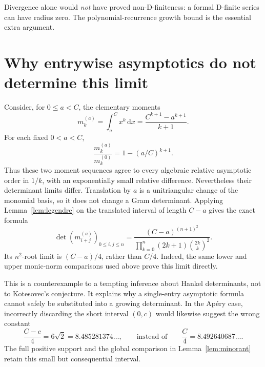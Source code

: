 \documentclass[11pt,a4paper]{article}
\numberwithin{equation}{section}
\theoremstyle{remark}\newtheorem{remark}[theorem]{Remark}
\newcommand{\dd}{\,\mathrm d}
\begin{document}
Divergence alone would \emph{not} have proved non-D-finiteness: a formal
D-finite series can have radius zero. The polynomial-recurrence growth bound
is the essential extra argument.

\section{Why entrywise asymptotics do not determine this limit}
\label{sec:pitfall}
Consider, for $0\leq a<C$, the elementary moments
\[
 m_k^{(a)}=\int_a^Cx^k\dd x=\frac{C^{k+1}-a^{k+1}}{k+1}.
\]
For each fixed $0<a<C$,
\[
 \frac{m_k^{(a)}}{m_k^{(0)}}=1-(a/C)^{k+1}.
\]
Thus these two moment sequences agree to every algebraic relative asymptotic
order in $1/k$, with an exponentially small relative difference.
Nevertheless their determinant limits differ.
Translation by $a$ is a unitriangular change of the monomial basis, so it does
not change a Gram determinant. Applying Lemma~\ref{lem:legendre} on the
translated interval of length $C-a$ gives the exact formula
\begin{equation}\label{eq:counterexample}
 \det(m_{i+j}^{(a)})_{0\leq i,j\leq n}
 =\frac{(C-a)^{(n+1)^2}}
 {\prod_{k=0}^n(2k+1)\binom{2k}{k}^2}.
\end{equation}
Its $n^2$-root limit is $(C-a)/4$, rather than $C/4$.
Indeed, the same lower and upper monic-norm comparisons used above prove
this limit directly.

This is a counterexample to a tempting inference about Hankel determinants,
not to Kotesovec's conjecture. It explains why a single-entry asymptotic
formula cannot safely be substituted into a growing determinant. In the
Ap\'ery case, incorrectly discarding the short interval $(0,c)$ would likewise
suggest the wrong constant
\[
 \frac{C-c}{4}=6\sqrt2=8.485281374\ldots,
 \qquad\text{instead of}\qquad
 \frac C4=8.492640687\ldots.
\]
The full positive support and the global comparison in
Lemma~\ref{lem:minorant} retain this small but consequential interval.
\end{document}
